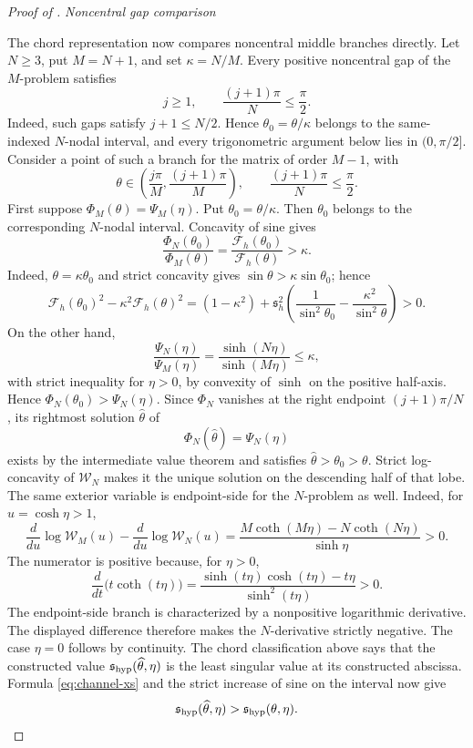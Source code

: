 \documentclass[12pt,anonymous]{iopjournal}
\numberwithin{equation}{section}
\theoremstyle{remark}
\newcommand{\proofstage}[1]{%
  \par\medskip\noindent\textit{#1}\par\nobreak\smallskip}
\begin{document}
\begin{proof}[Proof of ]
\proofstage{Noncentral gap comparison}
The chord representation now compares noncentral middle branches directly.
Let \(N\geq3\), put
\(M=N+1\), and set \(\kappa=N/M\).  Every positive noncentral gap of
the \(M\)-problem
satisfies
\begin{equation}\label{eq:noncentral-domain}
 j\geq1,\qquad \frac{(j+1)\pi}{N}\leq\frac{\pi}{2}.
\end{equation}
Indeed, such gaps satisfy \(j+1\leq N/2\).  Hence
\(\theta_0=\theta/\kappa\) belongs to the
same-indexed \(N\)-nodal interval, and every trigonometric argument
below lies in \((0,\pi/2]\).  Consider a point of such a branch for the
matrix of order \(M-1\), with
\[
 \theta\in\left(\frac{j\pi}{M},\frac{(j+1)\pi}{M}\right),
 \qquad \frac{(j+1)\pi}{N}\leq\frac{\pi}{2}.
\]
First suppose \(\Phi_M(\theta)=\Psi_M(\eta)\).  Put
\(\theta_0=\theta/\kappa\).  Then \(\theta_0\) belongs to the
corresponding \(N\)-nodal interval.  Concavity of sine gives
\begin{equation}\label{eq:Phi-scale}
 \frac{\Phi_N(\theta_0)}{\Phi_M(\theta)}
 =\frac{\mathcal F_h(\theta_0)}{\mathcal F_h(\theta)}>\kappa.
\end{equation}
Indeed, \(\theta=\kappa\theta_0\) and strict concavity gives
\(\sin\theta>\kappa\sin\theta_0\); hence
\[
 \mathcal F_h(\theta_0)^2-\kappa^2\mathcal F_h(\theta)^2
 =(1-\kappa^2)+\mathfrak s_h^2\left(
 \frac1{\sin^2\theta_0}-\frac{\kappa^2}{\sin^2\theta}
 \right)>0.
\]
On the other hand,
\begin{equation}\label{eq:Psi-scale}
 \frac{\Psi_N(\eta)}{\Psi_M(\eta)}
 =\frac{\sinh(N\eta)}{\sinh(M\eta)}\leq\kappa,
\end{equation}
with strict inequality for \(\eta>0\), by convexity of \(\sinh\) on
the positive half-axis.  Hence
\(\Phi_N(\theta_0)>\Psi_N(\eta)\).  Since \(\Phi_N\) vanishes at the right
endpoint \((j+1)\pi/N\), its rightmost solution
\(\widehat\theta\) of
\[
 \Phi_N(\widehat\theta)=\Psi_N(\eta)
\]
exists by the intermediate value theorem and satisfies
\(\widehat\theta>\theta_0>\theta\).  Strict log-concavity of
\(\mathcal W_N\) makes it the unique solution on the descending half
of that lobe.  The same exterior
variable is endpoint-side for the \(N\)-problem as well.  Indeed, for
\(u=\cosh\eta>1\),
\[
 \frac{d}{du}\log\mathcal W_M(u)-
 \frac{d}{du}\log\mathcal W_N(u)
 =\frac{M\coth(M\eta)-N\coth(N\eta)}{\sinh\eta}>0.
\]
The numerator is positive because, for \(\eta>0\),
\[
 \frac{d}{dt}\bigl(t\coth(t\eta)\bigr)
 =\frac{\sinh(t\eta)\cosh(t\eta)-t\eta}{\sinh^2(t\eta)}>0.
\]
The endpoint-side branch is characterized by a nonpositive logarithmic
derivative.  The displayed difference therefore makes the
\(N\)-derivative strictly negative.  The case \(\eta=0\) follows by
continuity.
The chord classification above says that the constructed value
\(\mathfrak s_{\rm hyp}(\widehat\theta,\eta)\) is the least singular
value at its constructed abscissa.  Formula
\eqref{eq:channel-xs} and the strict increase of sine on the interval
now give
\begin{equation}\label{eq:hyper-height-increase}
 \mathfrak s_{\rm hyp}(\widehat\theta,\eta)
 >\mathfrak s_{\rm hyp}(\theta,\eta).
\end{equation}


\end{proof}
\end{document}
